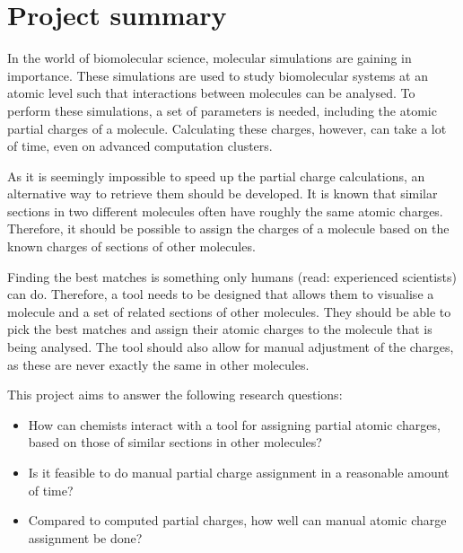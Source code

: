 \chapter{Project summary}

In the world of biomolecular science, molecular simulations are gaining in importance. These simulations are used to study biomolecular systems at an atomic level such that interactions between molecules can be analysed. To perform these simulations, a set of parameters is needed, including the atomic partial charges of a molecule. Calculating these charges, however, can take a lot of time, even on advanced computation clusters.

As it is seemingly impossible to speed up the partial charge calculations, an alternative way to retrieve them should be developed. It is known that similar sections in two different molecules often have roughly the same atomic charges. Therefore, it should be possible to assign the charges of a molecule based on the known charges of sections of other molecules.

Finding the best matches is something only humans (read: experienced scientists) can do. Therefore, a tool needs to be designed that allows them to visualise a molecule and a set of related sections of other molecules. They should be able to pick the best matches and assign their atomic charges to the molecule that is being analysed. The tool should also allow for manual adjustment of the charges, as these are never exactly the same in other molecules.

This project aims to answer the following research questions:
\begin{itemize}
\item How can chemists interact with a tool for assigning partial atomic charges, based on those of similar sections in other molecules?
\item Is it feasible to do manual partial charge assignment in a reasonable amount of time?
\item Compared to computed partial charges, how well can manual atomic charge assignment be done?
\end{itemize}
